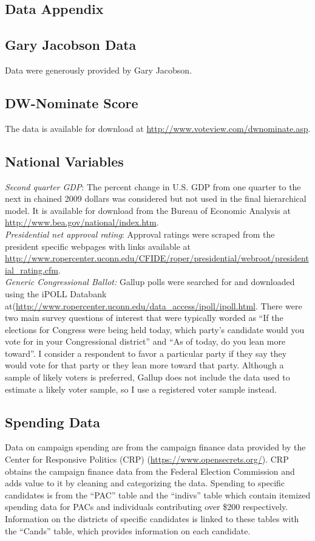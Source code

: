 \documentclass[12pt,final,fleqn]{article}
\theoremstyle{plain}
\begin{document}
\begin{appendices}
\section{Data Appendix} \label{sec: Data Appendix}
\subsection{Gary Jacobson Data}
Data were generously provided by Gary Jacobson.

\subsection{DW-Nominate Score}
The data is available for download at \url{http://www.voteview.com/dwnominate.asp}.

\subsection{National Variables}
\emph{Second quarter GDP}: The percent change in U.S. GDP from one quarter to the next in chained 2009 dollars was considered but not used in the final hierarchical model. It is available for download from the Bureau of Economic Analysis at \url{http://www.bea.gov/national/index.htm}. \\
\emph{Presidential net approval rating}: Approval ratings were scraped from the president specific webpages with links available at \url{http://www.ropercenter.uconn.edu/CFIDE/roper/presidential/webroot/presidential_rating.cfm}. \\
\emph{Generic Congressional Ballot:} Gallup polls were searched for and downloaded using the iPOLL Databank at(\url{http://www.ropercenter.uconn.edu/data_access/ipoll/ipoll.html}. There were two main survey questions of interest that were typically worded as ``If the elections for Congress were being held today, which party's candidate would you vote for in your 
Congressional district'' and ``As of today, do you lean more toward''. I consider a respondent to favor a particular party if they say they would vote for that party or they lean more toward that party. Although a sample of likely voters is preferred, Gallup does not include the data used to estimate a likely voter sample, so I use a registered voter sample instead.

\subsection{Spending Data}
Data on campaign spending are from the campaign finance data provided by the Center for Responsive Politics (CRP) (\url{https://www.opensecrets.org/}). CRP obtains the campaign finance data from the Federal Election Commission and adds value to it by cleaning and categorizing the data. Spending to specific candidates is from the ``PAC'' table and the ``indivs'' table which contain itemized spending data for PACs and individuals contributing over \$200 respectively. Information on the districts of specific candidates is linked to these tables with the ``Cands'' table, which provides information on each candidate. 


\end{appendices}
\end{document}
